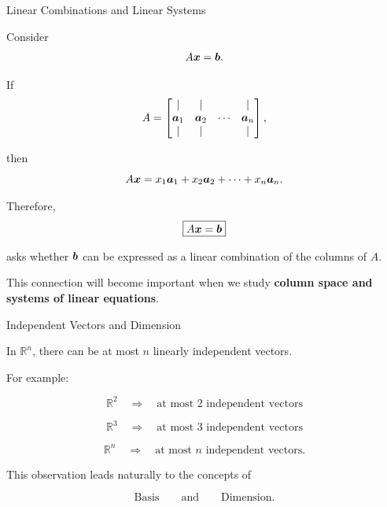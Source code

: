 \begin{frame}{Linear Combinations and Linear Systems}

Consider
\vspace{-0.1cm}
\[
A\bm{x}=\bm{b}.
\]

If
\vspace{-0.1cm}
\[
A=
\begin{bmatrix}
| & | & & |\\
\bm{a}_1 & \bm{a}_2 & \cdots & \bm{a}_n\\
| & | & & |
\end{bmatrix},
\]

then
\vspace{-0.1cm}
\[
A\bm{x}
=
x_1\bm{a}_1+
x_2\bm{a}_2+
\cdots+
x_n\bm{a}_n.
\]

Therefore,
\vspace{-0.1cm}
\[
\boxed{
A\bm{x}=\bm{b}
}
\]

asks whether $\bm{b}$ can be expressed as a linear combination
of the columns of $A$.

\vspace{0.1cm}

This connection will become important when we study
\textbf{column space and systems of linear equations}.

\end{frame}



\begin{frame}{Independent Vectors and Dimension}

In $\mathbb{R}^n$, there can be at most $n$ linearly independent
vectors.

For example:

\[
\mathbb{R}^2
\quad\Rightarrow\quad
\text{at most 2 independent vectors}
\]

\[
\mathbb{R}^3
\quad\Rightarrow\quad
\text{at most 3 independent vectors}
\]

\[
\mathbb{R}^n
\quad\Rightarrow\quad
\text{at most }n\text{ independent vectors}.
\]

\vspace{0.5cm}

This observation leads naturally to the concepts of

\[
\boxed{
\text{Basis}
\qquad\text{and}\qquad
\text{Dimension}.
}
\]

\end{frame}